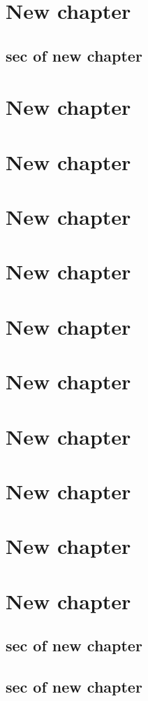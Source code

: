 \documentclass[11pt,table]{book}
\begin{document}
\chapter{New chapter}
 \section{sec of new chapter}
 
\chapter{New chapter}
\chapter{New chapter}
\chapter{New chapter}
\chapter{New chapter}
\chapter{New chapter}
\chapter{New chapter}
\chapter{New chapter}
\chapter{New chapter}
\chapter{New chapter}
\chapter{New chapter}
 \section{sec of new chapter}\lipsum[1-5]
 \section{sec of new chapter}
\lipsum[1-5]



\newpage

\end{document}
